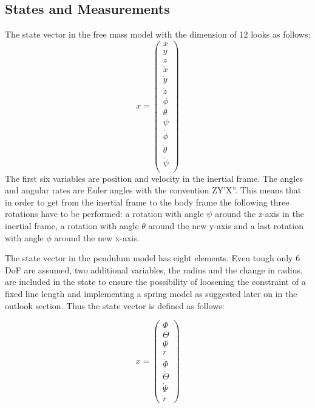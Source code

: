 \subsection*{States and Measurements}
The state vector in the free mass model with the dimension of 12 looks as follows:
\begin{equation}
 x=
 \begin{pmatrix}
  x \\
  y \\
  z \\
  \dot{x} \\
  \dot{y} \\
  \dot{z} \\
  \phi \\
  \theta \\
  \psi \\
  \dot{\phi} \\
  \dot{\theta} \\
  \dot{\psi} \\
 \end{pmatrix}
\end{equation}
The first six variables are position and velocity in the inertial frame. The angles and angular rates are Euler angles with the convention ZY'X''. This means that in order to get from the inertial frame to the body frame the following three rotations have to be performed: a rotation with angle $\psi$ around the z-axis in the inertial frame, a rotation with angle $\theta$ around the new y-axis and a last rotation with angle $\phi$ around the new x-axis.

The state vector in the pendulum model has eight elements. Even tough only 6 DoF are assumed, two additional variables, the radius and the change in radius, are included in the state to ensure the possibility of loosening the constraint of a fixed line length and implementing a spring model as suggested later on in the outlook section. Thus the state vector is defined as follows:

\begin{equation}
 x=
 \begin{pmatrix}
  \Phi \\
  \Theta \\
  \Psi \\
  r \\
  \dot{\Phi} \\
  \dot{\Theta} \\
  \dot{\Psi} \\
  \dot{r}
 \end{pmatrix}
\end{equation}

